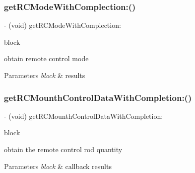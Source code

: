\subsubsection{\texorpdfstring{get\+R\+C\+Mode\+With\+Complection\+:()}{getRCModeWithComplection:()}}
{\footnotesize\ttfamily -\/ (void) get\+R\+C\+Mode\+With\+Complection\+: \begin{DoxyParamCaption}\item[{(void($^\wedge$)(P\+V\+R\+C\+Mode rc\+Mode, N\+S\+Error $\ast$\hyperlink{group___p_v_s_d_k___c_o_r_e___a_p_i___m_o_u_n_t_c_o_n_t_r_o_l_ga5a1de33b230662127568783314b4a54d}{\+\_\+\+Nullable} error))}]{block }\end{DoxyParamCaption}}

obtain remote control mode


\begin{DoxyParams}{Parameters}
{\em block} & results \\
\hline
\end{DoxyParams}
\mbox{\label{interface_p_v_remote_controller_abe3f77888a7bc97198114368993285b2}} 
\subsubsection{\texorpdfstring{get\+R\+C\+Mounth\+Control\+Data\+With\+Completion\+:()}{getRCMounthControlDataWithCompletion:()}}
{\footnotesize\ttfamily -\/ (void) get\+R\+C\+Mounth\+Control\+Data\+With\+Completion\+: \begin{DoxyParamCaption}\item[{(void($^\wedge$)(\hyperlink{struct_p_v_r_c_mounth_data}{P\+V\+R\+C\+Mounth\+Data} data, N\+S\+Error $\ast$\hyperlink{group___p_v_s_d_k___c_o_r_e___a_p_i___m_o_u_n_t_c_o_n_t_r_o_l_ga5a1de33b230662127568783314b4a54d}{\+\_\+\+Nullable} error))}]{block }\end{DoxyParamCaption}}

obtain the remote control rod quantity


\begin{DoxyParams}{Parameters}
{\em block} & callback results \\
\hline
\end{DoxyParams}
\mbox{\label{interface_p_v_remote_controller_a537c58487b921795637e031cf15d6679}} 

